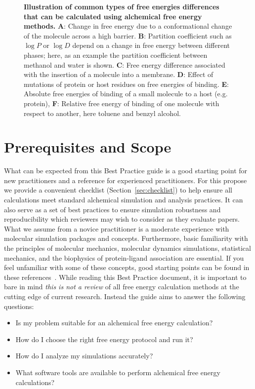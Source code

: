\documentclass[9pt,bestpractices]{livecoms}
\begin{document}
\begin{figure}
    \caption{\textbf{Illustration of common types of free energies differences that can be calculated using alchemical free energy methods.} \textbf{A}: Change in free energy due to a conformational change of the molecule across a high barrier. \textbf{B}: Partition coefficient such as $\log P$ or $\log D$ depend on a change in free energy between different phases; here, as an example the partition coefficient between methanol and water is shown. \textbf{C}: Free energy difference associated with the insertion of a molecule into a membrane. \textbf{D}: Effect of mutations of protein or host residues on free energies of binding. \textbf{E}: Absolute free energies of binding of a small molecule to a host (e.g. protein), \textbf{F}: Relative free energy of binding of one molecule with respect to another, here toluene and benzyl alcohol.
    \label{fig:fig_what_is_alchemy}
    }
\end{figure}

\section{Prerequisites and Scope}
\label{sec:pre}
What can be expected from this Best Practice guide is a good starting point for new practitioners and a reference for experienced practitioners. For this propose we provide a convenient checklist (Section~\ref{sec:checklist}) to help ensure all calculations meet standard alchemical simulation and analysis practices. It can also serve as a set of best practices to ensure simulation robustness and reproducibility which reviewers may wish to consider as they evaluate papers.
What we assume from a novice practitioner is a moderate experience with molecular simulation packages and concepts. Furthermore, basic familiarity with the principles of molecular mechanics, molecular dynamics simulations, statistical mechanics, and the biophysics of protein-ligand association are essential. If you feel unfamiliar with some of these concepts, good starting points can be found in these references~\cite{braun2019best, grossfield2018best, klimovich2015guidelines, shirts2012best}. While reading this Best Practice document, it is important to bare in mind \emph{this is not a review} of all free energy calculation methods at the cutting edge of current research.
Instead the guide aims to answer the following questions:
\begin{itemize}
    \item Is my problem suitable for an alchemical free energy calculation? 
    \item How do I choose the right free energy protocol and run it? 
    \item How do I analyze my simulations accurately? 
    \item What software tools are available to perform alchemical free energy calculations? 
\end{itemize}
%
\end{document}
